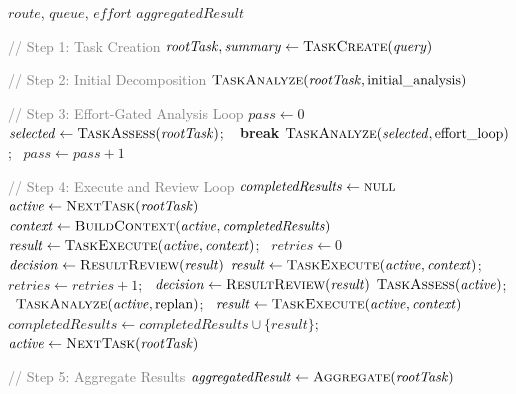 \documentclass{article}
\begin{document}
\begin{algorithm}[t]
\caption{TINYCUA Task Processing (Algorithm 3)}
\label{alg:task-processing}
\begin{algorithmic}[1]
\Require $\mathit{route}$, $\mathit{queue}$, $\mathit{effort}$
\Ensure $\mathit{aggregatedResult}$

\Statex \textcolor{gray}{// Step 1: Task Creation}
    \State $\mathit{rootTask}, \mathit{summary} \gets \textsc{TaskCreate}(\mathit{query})$
\EndIf

\Statex \textcolor{gray}{// Step 2: Initial Decomposition}
\State $\textsc{TaskAnalyze}(\mathit{rootTask}, \text{initial\_analysis})$

\Statex \textcolor{gray}{// Step 3: Effort-Gated Analysis Loop}
\State $\mathit{pass} \gets 0$
    \State $\mathit{selected} \gets \textsc{TaskAssess}(\mathit{rootTask})$; \  \textbf{break} \EndIf
    \State $\textsc{TaskAnalyze}(\mathit{selected}, \text{effort\_loop})$; \ $\mathit{pass} \gets \mathit{pass} + 1$
\EndWhile

\Statex \textcolor{gray}{// Step 4: Execute and Review Loop}
\State $\mathit{completedResults} \gets \textsc{null}$
\State $\mathit{active} \gets \textsc{NextTask}(\mathit{rootTask})$
    \State $\mathit{context} \gets \textsc{BuildContext}(\mathit{active}, \mathit{completedResults})$
    \State $\mathit{result} \gets \textsc{TaskExecute}(\mathit{active}, \mathit{context})$; \ $\mathit{retries} \gets 0$
    \State $\mathit{decision} \gets \textsc{ResultReview}(\mathit{result})$
        \State $\mathit{result} \gets \textsc{TaskExecute}(\mathit{active}, \mathit{context})$; \ $\mathit{retries} \gets \mathit{retries} + 1$; \ $\mathit{decision} \gets \textsc{ResultReview}(\mathit{result})$
    \EndWhile
        \State $\textsc{TaskAssess}(\mathit{active})$; \ $\textsc{TaskAnalyze}(\mathit{active}, \text{replan})$; \ $\mathit{result} \gets \textsc{TaskExecute}(\mathit{active}, \mathit{context})$
    \EndIf
        \State $\mathit{completedResults} \gets \mathit{completedResults} \cup \{\mathit{result}\}$; \ $\mathit{active} \gets \textsc{NextTask}(\mathit{rootTask})$
    \EndIf
\EndWhile

\Statex \textcolor{gray}{// Step 5: Aggregate Results}
\State $\mathit{aggregatedResult} \gets \textsc{Aggregate}(\mathit{rootTask})$

\end{algorithmic}
\end{algorithm}
\end{document}

